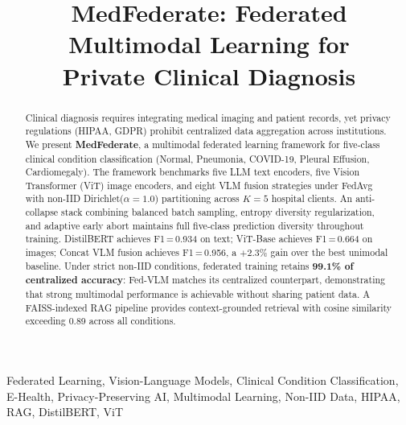 \documentclass[conference]{IEEEtran}
\begin{document}
\renewcommand{\arraystretch}{0.85}
\setlength{\abovecaptionskip}{0pt}
\setlength{\belowcaptionskip}{0pt}
\renewcommand{\dbltopfraction}{0.9}
\renewcommand{\topfraction}{0.9}

\title{MedFederate: Federated Multimodal Learning for\\
       Private Clinical Diagnosis}

\author{%
}

\maketitle

\begin{abstract}
Clinical diagnosis requires integrating medical imaging and patient
records, yet privacy regulations (HIPAA, GDPR) prohibit centralized
data aggregation across institutions.
We present \textbf{MedFederate}, a multimodal federated learning
framework for five-class clinical condition classification
(Normal, Pneumonia, COVID-19, Pleural Effusion, Cardiomegaly).
The framework benchmarks five LLM text encoders, five Vision Transformer
(ViT) image encoders, and eight VLM fusion strategies under FedAvg
with non-IID Dirichlet($\alpha{=}1.0$) partitioning across $K{=}5$
hospital clients.
An anti-collapse stack combining balanced batch sampling, entropy
diversity regularization, and adaptive early abort maintains full
five-class prediction diversity throughout training.
DistilBERT achieves F1\,=\,0.934 on text; ViT-Base achieves
F1\,=\,0.664 on images; Concat VLM fusion achieves F1\,=\,0.956,
a $+$2.3\% gain over the best unimodal baseline.
Under strict non-IID conditions, federated training retains
\textbf{99.1\% of centralized accuracy}: Fed-VLM matches its
centralized counterpart, demonstrating that strong multimodal
performance is achievable without sharing patient data.
A FAISS-indexed RAG pipeline provides context-grounded retrieval
with cosine similarity exceeding 0.89 across all conditions.
\end{abstract}

\begin{IEEEkeywords}
Federated Learning, Vision-Language Models, Clinical Condition
Classification, E-Health, Privacy-Preserving AI, Multimodal Learning,
Non-IID Data, HIPAA, RAG, DistilBERT, ViT
\end{IEEEkeywords}
\end{document}
